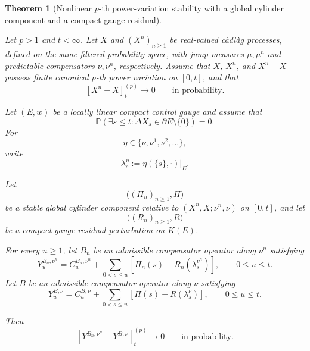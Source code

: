 \documentclass[a4paper,10pt]{article}
\newtheorem{thm}{Theorem}[section]
\renewcommand{\P}{\mathbb P}
\begin{document}
\begin{thm}
[Nonlinear \(p\)-th power-variation stability with a global cylinder
component and a compact-gauge residual]
\label{thm:compact-gauge-nonlinear-pvar-stability}

Let \(p>1\) and \(t<\infty\). Let \(X\) and
\((X^n)_{n\ge1}\) be real-valued càdlàg processes, defined on the same
filtered probability space, with jump measures \(\mu,\mu^n\) and
predictable compensators \(\nu,\nu^n\), respectively. Assume that
\(X\), \(X^n\), and \(X^n-X\) possess finite canonical \(p\)-th power
variation on \([0,t]\), and that
\[
        [X^n-X]^{(p)}_t
        \longrightarrow0
        \qquad\text{in probability}.
\]

Let \((E,w)\) be a locally linear compact control gauge and assume
that
\[
\P\left(
        \exists s\le t:
        \Delta X_s\in\partial E\setminus\{0\}
\right)
=
0.
\]
For
\[
        \eta\in\{\nu,\nu^1,\nu^2,\ldots\},
\]
write
\[
        \lambda_s^\eta
        :=
        \eta(\{s\},\cdot)|_E.
\]

Let
\[
        \bigl((\Pi_n)_{n\ge1},\Pi\bigr)
\]
be a stable global cylinder component relative to
\((X^n,X;\nu^n,\nu)\) on \([0,t]\), and let
\[
        \bigl((R_n)_{n\ge1},R\bigr)
\]
be a compact-gauge residual perturbation on \(K(E)\).

For every \(n\ge1\), let \(B_n\) be an admissible compensator
operator along \(\nu^n\) satisfying
\[
Y_u^{B_n,\nu^n}
=
C_u^{B_n,\nu^n}
+
\sum_{0<s\le u}
\left[
        \Pi_n(s)+R_n(\lambda_s^{\nu^n})
\right],
\qquad 0\le u\le t.
\]
Let \(B\) be an admissible compensator operator along \(\nu\)
satisfying
\[
Y_u^{B,\nu}
=
C_u^{B,\nu}
+
\sum_{0<s\le u}
\left[
        \Pi(s)+R(\lambda_s^\nu)
\right],
\qquad 0\le u\le t.
\]

Then
\[
        [Y^{B_n,\nu^n}-Y^{B,\nu}]^{(p)}_t
        \longrightarrow0
        \qquad\text{in probability}.
\]
\end{thm}
\end{document}
